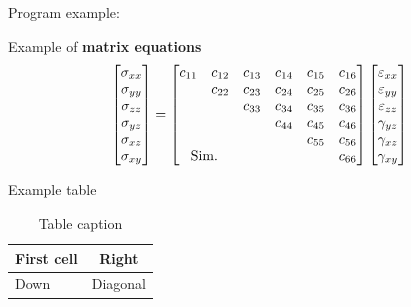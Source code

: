 \documentclass[12pt]{beamer}
\begin{document}
\begin{frame}{}


Program example:


Example of \textbf{matrix equations} %
\footnotesize
\begin{equation}
    \begin{bmatrix}
       \sigma_{xx} \\
       \sigma_{yy} \\
       \sigma_{zz} \\
       \sigma_{yz} \\
       \sigma_{xz} \\
       \sigma_{xy} \\
    \end{bmatrix} 
     = 
    \begin{bmatrix}
       c_{11} & c_{12} & c_{13} & c_{14} & c_{15} & c_{16} \\
       & c_{22} & c_{23} & c_{24} & c_{25} & c_{26} \\
       & & c_{33} & c_{34} & c_{35} & c_{36} \\
       & & & c_{44} & c_{45} & c_{46} \\
       & & & & c_{55} & c_{56} \\
       \multicolumn{2}{c}{\text{Sim.}} & & & & c_{66} \\
    \end{bmatrix} 
    \begin{bmatrix}
       \varepsilon_{xx} \\
       \varepsilon_{yy} \\
       \varepsilon_{zz} \\
       \gamma_{yz} \\
       \gamma_{xz} \\
       \gamma_{xy} \\
    \end{bmatrix} 
\end{equation}

\end{frame}

\begin{frame}{}

Example table

\begin{table}[H]
\large
\centering
\caption{Table caption}
\begin{tabular}[H]{|l|c|}
\hline
First cell & Right \\ \hline
Down & Diagonal \\ \hline
\end{tabular}
\end{table}
\end{frame}
\end{document}
